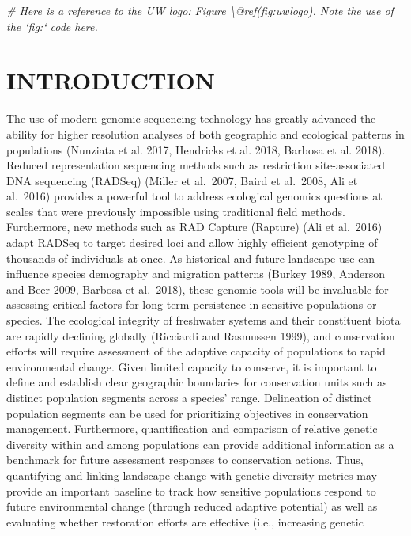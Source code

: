 \documentclass[twoside,12pt,final]{ucthesis-CA2012} %
\newenvironment{Shaded}{}{}
\newcommand{\CommentTok}[1]{\textcolor[rgb]{0.38,0.63,0.69}{\textit{{#1}}}}
\begin{document}
\begin{ucmainmatter}
\begin{Shaded}
\begin{Highlighting}[]
\CommentTok{# Here is a reference to the UW logo: Figure \textbackslash{}@ref(fig:uwlogo).  Note the use of the `fig:` code here.}
\end{Highlighting}
\end{Shaded}
\hypertarget{introduction-2}{%
\section{INTRODUCTION}\label{introduction-2}}

The use of modern genomic sequencing technology has greatly advanced the
ability for higher resolution analyses of both geographic and ecological
patterns in populations (Nunziata et al. 2017, Hendricks et al. 2018,
Barbosa et al. 2018). Reduced representation sequencing methods such as
restriction site-associated DNA sequencing (RADSeq) (Miller et al.~2007,
Baird et al.~2008, Ali et al.~2016) provides a powerful tool to address
ecological genomics questions at scales that were previously impossible
using traditional field methods. Furthermore, new methods such as RAD
Capture (Rapture) (Ali et al.~2016) adapt RADSeq to target desired loci
and allow highly efficient genotyping of thousands of individuals at
once. As historical and future landscape use can influence species
demography and migration patterns (Burkey 1989, Anderson and Beer 2009,
Barbosa et al.~2018), these genomic tools will be invaluable for
assessing critical factors for long-term persistence in sensitive
populations or species. The ecological integrity of freshwater systems
and their constituent biota are rapidly declining globally (Ricciardi
and Rasmussen 1999), and conservation efforts will require assessment of
the adaptive capacity of populations to rapid environmental change.
Given limited capacity to conserve, it is important to define and
establish clear geographic boundaries for conservation units such as
distinct population segments across a species' range. Delineation of
distinct population segments can be used for prioritizing objectives in
conservation management. Furthermore, quantification and comparison of
relative genetic diversity within and among populations can provide
additional information as a benchmark for future assessment responses to
conservation actions. Thus, quantifying and linking landscape change
with genetic diversity metrics may provide an important baseline to
track how sensitive populations respond to future environmental change
(through reduced adaptive potential) as well as evaluating whether
restoration efforts are effective (i.e., increasing genetic

\end{ucmainmatter}
\end{document}

